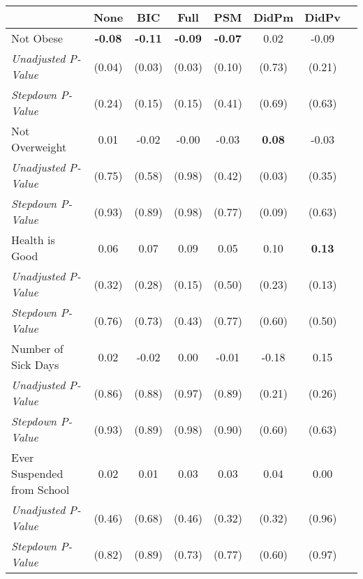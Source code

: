\begin{tabular}{l c c c c c c c}
\toprule
 & None & BIC & Full & PSM & DidPm & DidPv \\
\midrule
Not Obese & \textbf{ -0.08 } & \textbf{ -0.11 } & \textbf{ -0.09 } & \textbf{ -0.07 } & 0.02 & -0.09 \\
\quad \textit{Unadjusted P-Value} & (0.04) & (0.03) & (0.03) & (0.10) & (0.73) & (0.21) \\
\quad \textit{Stepdown P-Value} & (0.24) & (0.15) & (0.15) & (0.41) & (0.69) & (0.63) \\
Not Overweight & 0.01 & -0.02 & -0.00 & -0.03 & \textbf{ 0.08 } & -0.03 \\
\quad \textit{Unadjusted P-Value} & (0.75) & (0.58) & (0.98) & (0.42) & (0.03) & (0.35) \\
\quad \textit{Stepdown P-Value} & (0.93) & (0.89) & (0.98) & (0.77) & (0.09) & (0.63) \\
Health is Good & 0.06 & 0.07 & 0.09 & 0.05 & 0.10 & \textbf{ 0.13 } \\
\quad \textit{Unadjusted P-Value} & (0.32) & (0.28) & (0.15) & (0.50) & (0.23) & (0.13) \\
\quad \textit{Stepdown P-Value} & (0.76) & (0.73) & (0.43) & (0.77) & (0.60) & (0.50) \\
Number of Sick Days & 0.02 & -0.02 & 0.00 & -0.01 & -0.18 & 0.15 \\
\quad \textit{Unadjusted P-Value} & (0.86) & (0.88) & (0.97) & (0.89) & (0.21) & (0.26) \\
\quad \textit{Stepdown P-Value} & (0.93) & (0.89) & (0.98) & (0.90) & (0.60) & (0.63) \\
Ever Suspended from School & 0.02 & 0.01 & 0.03 & 0.03 & 0.04 & 0.00 \\
\quad \textit{Unadjusted P-Value} & (0.46) & (0.68) & (0.46) & (0.32) & (0.32) & (0.96) \\
\quad \textit{Stepdown P-Value} & (0.82) & (0.89) & (0.73) & (0.77) & (0.60) & (0.97) \\
\bottomrule
\end{tabular}
